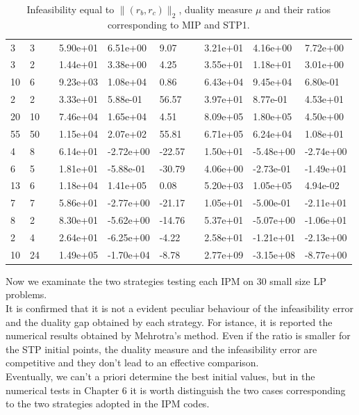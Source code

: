 \documentclass[a4paper,10 pt,titlepage,twoside]{book}
\theoremstyle{plain}
\theoremstyle{definition}
\theoremstyle{remark}
\begin{document}
\begin{table}[!h]
\begin{tabular}{llllllllll}
		3 & 3 &  & 5.90e+01 & 6.51e+00 & 9.07 &  & 3.21e+01 & 4.16e+00 & 7.72e+00 \\
		3 & 2 &  & 1.44e+01 & 3.38e+00 & 4.25 &  & 3.55e+01 & 1.18e+01 & 3.01e+00 \\
		10 & 6 &  & 9.23e+03 & 1.08e+04 & 0.86 &  & 6.43e+04 & 9.45e+04 & 6.80e-01 \\
		2 & 2 &  & 3.33e+01 & 5.88e-01 & 56.57 &  & 3.97e+01 & 8.77e-01 & 4.53e+01 \\
		20 & 10 &  & 7.46e+04 & 1.65e+04 & 4.51 &  & 8.09e+05 & 1.80e+05 & 4.50e+00 \\
		55 & 50 &  & 1.15e+04 & 2.07e+02 & 55.81 &  & 6.71e+05 & 6.24e+04 & 1.08e+01 \\
		4 & 8 &  & 6.14e+01 & -2.72e+00 & -22.57 &  & 1.50e+01 & -5.48e+00 & -2.74e+00 \\
		6 & 5 &  & 1.81e+01 & -5.88e-01 & -30.79 &  & 4.06e+00 & -2.73e-01 & -1.49e+01 \\
		13 & 6 &  & 1.18e+04 & 1.41e+05 & 0.08 &  & 5.20e+03 & 1.05e+05 & 4.94e-02 \\
		7 & 7 &  & 5.86e+01 & -2.77e+00 & -21.17 &  & 1.05e+01 & -5.00e-01 & -2.11e+01 \\
		8 & 2 &  & 8.30e+01 & -5.62e+00 & -14.76 &  & 5.37e+01 & -5.07e+00 & -1.06e+01 \\
		2 & 4 &  & 2.64e+01 & -6.25e+00 & -4.22 &  & 2.58e+01 & -1.21e+01 & -2.13e+00 \\
		10 & 24 &  & 1.49e+05 & -1.70e+04 & -8.78 &  & 2.77e+09 & -3.15e+08 & -8.77e+00 \\ \hline
	\end{tabular}\caption{Infeasibility equal to $\lVert (r_{b}, r_{c})\rVert_{2}$, duality measure ${\mu}$ and their ratios corresponding to MIP and STP1.}
\end{table}
Now we examinate the two strategies testing each IPM on 30 small size LP problems.\\ 
It is confirmed that it is not a evident peculiar behaviour of the infeasibility error and the duality gap obtained by each strategy. For istance, it is reported the numerical results obtained by Mehrotra's method. Even if the ratio is smaller for the STP initial points, the duality measure and the infeasibility error are competitive and they don't lead to an effective comparison. \\Eventually, we can't a priori determine the best initial values, but in the numerical tests in Chapter 6 it is worth distinguish the two cases corresponding to the two strategies adopted in the IPM codes. 
\end{document}
